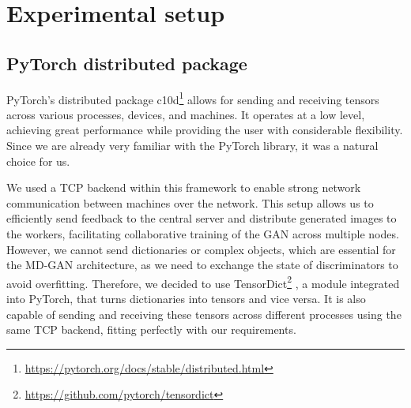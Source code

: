 \chapter{Experimental setup}

\section{PyTorch distributed package}
PyTorch's distributed package c10d\footnote{\url{https://pytorch.org/docs/stable/distributed.html}} allows for sending and receiving tensors across various processes, devices, and machines. It operates at a low level, achieving great performance while providing the user with considerable flexibility. Since we are already very familiar with the PyTorch library, it was a natural choice for us.


We used a TCP backend within this framework to enable strong network communication between machines over the network. This setup allows us to efficiently send feedback to the central server and distribute generated images to the workers, facilitating collaborative training of the GAN across multiple nodes. However, we cannot send dictionaries or complex objects, which are essential for the MD-GAN architecture, as we need to exchange the state of discriminators to avoid overfitting. Therefore, we decided to use TensorDict\footnote{\url{https://github.com/pytorch/tensordict}} \cite{tensordict}, a module integrated into PyTorch, that turns dictionaries into tensors and vice versa. It is also capable of sending and receiving these tensors across different processes using the same TCP backend, fitting perfectly with our requirements.

